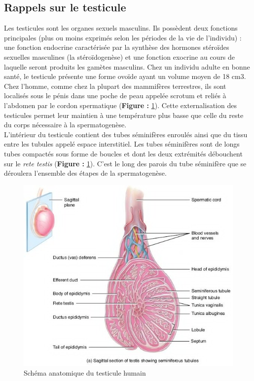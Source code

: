 \documentclass[12pt,twoside]{reedthesis}
\theoremstyle{definition}
\theoremstyle{definition}
\theoremstyle{remark}
\begin{document}
  \subsection{Rappels sur le testicule}\label{rappels-sur-le-testicule}
  
  Les testicules sont les organes sexuels masculins. Ils possèdent deux
  fonctions principales (plus ou moins exprimés selon les périodes de la
  vie de l'individu) : une fonction endocrine caractérisée par la synthèse
  des hormones stéroïdes sexuelles masculines (la stéroïdogenèse) et une
  fonction exocrine au cours de laquelle seront produits les gamètes
  masculins. Chez un individu adulte en bonne santé, le testicule présente
  une forme ovoïde ayant un volume moyen de 18 cm3. Chez l'homme, comme
  chez la plupart des mammifères terrestres, ils sont localisés sous le
  pénis dans une poche de peau appelée scrotum et reliés à l'abdomen par
  le cordon spermatique (\textbf{Figure :} \ref{fig:testicule}). Cette
  externalisation des testicules permet leur maintien à une température
  plus basse que celle du reste du corps nécessaire à la spermatogenèse.\\
  L'intérieur du testicule contient des tubes séminifères enroulés ainsi
  que du tissu entre les tubules appelé espace interstitiel. Les tubes
  séminifères sont de longs tubes compactés sous forme de boucles et dont
  les deux extrémités débouchent sur le \emph{rete testis} (\textbf{Figure
  :} \ref{fig:testicule}). C'est le long des parois du tube séminifère que
  se déroulera l'ensemble des étapes de la spermatogenèse.
  
  \begin{figure}
  
  {\centering \includegraphics[scale=0.65]{figure/coupe_testicule2} 
  
  }
  
  \caption{Schéma anatomique du testicule humain}\label{fig:testicule}
  \end{figure}
  
\end{document}
